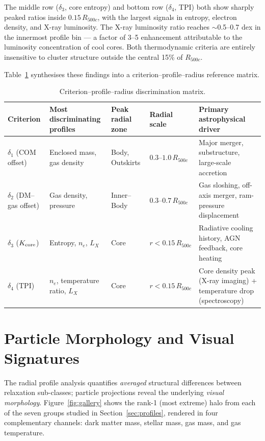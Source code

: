 \documentclass[12pt]{article}
\newcommand{\Rfive}{R_{500c}}
\newcommand{\Kcore}{K_{\rm core}}
\newcommand{\deltai}{\delta_1}
\newcommand{\deltaii}{\delta_2}
\newcommand{\deltaiii}{\delta_3}
\newcommand{\deltaiv}{\delta_4}
\begin{document}
The middle row ($\deltaiii$, core entropy) and bottom row ($\deltaiv$, TPI) both show
sharply peaked ratios inside $0.15\,\Rfive$, with the largest signals in entropy,
electron density, and X-ray luminosity.  The X-ray luminosity ratio reaches
$\sim$0.5--0.7 dex in the innermost profile bin --- a factor of 3--5 enhancement
attributable to the luminosity concentration of cool cores.  Both thermodynamic
criteria are entirely insensitive to cluster structure outside the central 15\% of $\Rfive$.

Table~\ref{tab:discrimination} synthesises these findings into a criterion--profile--radius
reference matrix.

\begin{table}[htbp]
\centering
\caption{Criterion--profile--radius discrimination matrix.}
\label{tab:discrimination}
\begin{tabular}{p{2.0cm} p{3.8cm} p{2.5cm} p{2.8cm} p{4.5cm}}
\toprule
Criterion & Most discriminating profiles & Peak radial zone & Radial scale & Primary astrophysical driver \\
\midrule
$\deltai$ (COM offset)
  & Enclosed mass, gas density
  & Body, Outskirts
  & $0.3$--$1.0\,\Rfive$
  & Major merger, substructure, large-scale accretion \\[4pt]
$\deltaii$ (DM--gas offset)
  & Gas density, pressure
  & Inner--Body
  & $0.3$--$0.7\,\Rfive$
  & Gas sloshing, off-axis merger, ram-pressure displacement \\[4pt]
$\deltaiii$ ($\Kcore$)
  & Entropy, $n_e$, $L_X$
  & Core
  & $r < 0.15\,\Rfive$
  & Radiative cooling history, AGN feedback, core heating \\[4pt]
$\deltaiv$ (TPI)
  & $n_e$, temperature ratio, $L_X$
  & Core
  & $r < 0.15\,\Rfive$
  & Core density peak (X-ray imaging) + temperature drop (spectroscopy) \\
\bottomrule
\end{tabular}
\end{table}

\FloatBarrier
\section{Particle Morphology and Visual Signatures}
\label{sec:morphology}

The radial profile analysis quantifies \emph{averaged} structural differences between
relaxation sub-classes; particle projections reveal the underlying \emph{visual morphology}.
Figure~\ref{fig:gallery} shows the rank-1 (most extreme) halo from each of the seven
groups studied in Section~\ref{sec:profiles}, rendered in four complementary channels:
dark matter mass, stellar mass, gas mass, and gas temperature.
\end{document}
